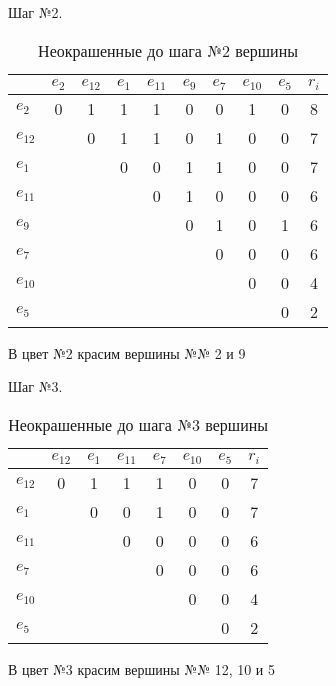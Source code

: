 \documentclass[a4paper,12pt]{article}
\begin{document}
\bigskip
\noindent\begin{minipage}[0cm]{\textwidth}
    Шаг №2.
    \begin{table}[H]
        \caption{Неокрашенные до шага №2 вершины}
        \begin{tabular}{l|*{8}{c}|c}
                    & $e_2$ & $e_{12}$ & $e_1$ & $e_{11}$ & $e_9$ & $e_7$ & $e_{10}$ & $e_5$ & $r_i$ \\ \hline
            $e_{ 2}$ &     0 &        1 &     1 &        1 &     0 &     0 &        1 &     0 &    8 \\
            $e_{12}$ &       &        0 &     1 &        1 &     0 &     1 &        0 &     0 &    7 \\
            $e_{ 1}$ &       &          &     0 &        0 &     1 &     1 &        0 &     0 &    7 \\
            $e_{11}$ &       &          &       &        0 &     1 &     0 &        0 &     0 &    6 \\
            $e_{ 9}$ &       &          &       &          &     0 &     1 &        0 &     1 &    6 \\
            $e_{ 7}$ &       &          &       &          &       &     0 &        0 &     0 &    6 \\
            $e_{10}$ &       &          &       &          &       &       &        0 &     0 &    4 \\
            $e_{ 5}$ &       &          &       &          &       &       &          &     0 &    2 \\
        \end{tabular}
    \end{table}
    В цвет №2 красим вершины №№ 2 и 9
\end{minipage}

\bigskip
\noindent\begin{minipage}[0cm]{\textwidth}
    Шаг №3.
    \begin{table}[H]
        \caption{Неокрашенные до шага №3 вершины}
        \begin{tabular}{l|*{6}{c}|c}
                     & $e_{12}$ & $e_1$ & $e_{11}$ & $e_7$ & $e_{10}$ & $e_5$ & $r_i$ \\ \hline
            $e_{12}$ &        0 &     1 &        1 &     1 &        0 &     0 &     7 \\
            $e_{ 1}$ &          &     0 &        0 &     1 &        0 &     0 &     7 \\
            $e_{11}$ &          &       &        0 &     0 &        0 &     0 &     6 \\
            $e_{ 7}$ &          &       &          &     0 &        0 &     0 &     6 \\
            $e_{10}$ &          &       &          &       &        0 &     0 &     4 \\
            $e_{ 5}$ &          &       &          &       &          &     0 &     2 \\
        \end{tabular}
    \end{table}
    В цвет №3 красим вершины №№ 12, 10 и 5
\end{minipage}
\end{document}
